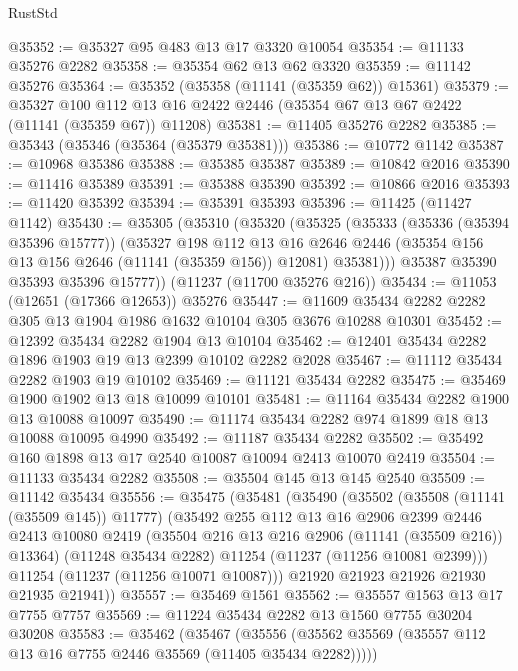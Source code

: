 \begin{lexlean}{RustStd}
\begin{coremodule}
@35352 := @35327 @95 @483 @13 @17 @3320 @10054
@35354 := @11133 @35276 @2282
@35358 := @35354 @62 @13 @62 @3320
@35359 := @11142 @35276
@35364 := @35352 (@35358 (@11141 (@35359 @62)) @15361)
@35379 := @35327
    @100
    @112
    @13
    @16
    @2422
    @2446
    (@35354 @67 @13 @67 @2422 (@11141 (@35359 @67)) @11208)
@35381 := @11405 @35276 @2282
@35385 := @35343 (@35346 (@35364 (@35379 @35381)))
@35386 := @10772 @1142
@35387 := @10968 @35386
@35388 := @35385 @35387
@35389 := @10842 @2016
@35390 := @11416 @35389
@35391 := @35388 @35390
@35392 := @10866 @2016
@35393 := @11420 @35392
@35394 := @35391 @35393
@35396 := @11425 (@11427 @1142)
@35430 := @35305
    (@35310
      (@35320
        (@35325
          (@35333
            (@35336 (@35394 @35396 @15777))
            (@35327
              @198
              @112
              @13
              @16
              @2646
              @2446
              (@35354 @156 @13 @156 @2646 (@11141 (@35359 @156)) @12081)
              @35381)))
        @35387
        @35390
        @35393
        @35396
        @15777))
    (@11237 (@11700 @35276 @216))
@35434 := @11053 (@12651 (@17366 @12653)) @35276
@35447 := @11609 @35434 @2282 @2282 @305 @13 @1904 @1986 @1632 @10104 @305 @3676 @10288 @10301
@35452 := @12392 @35434 @2282 @1904 @13 @10104
@35462 := @12401 @35434 @2282 @1896 @1903 @19 @13 @2399 @10102 @2282 @2028
@35467 := @11112 @35434 @2282 @1903 @19 @10102
@35469 := @11121 @35434 @2282
@35475 := @35469 @1900 @1902 @13 @18 @10099 @10101
@35481 := @11164 @35434 @2282 @1900 @13 @10088 @10097
@35490 := @11174 @35434 @2282 @974 @1899 @18 @13 @10088 @10095 @4990
@35492 := @11187 @35434 @2282
@35502 := @35492 @160 @1898 @13 @17 @2540 @10087 @10094 @2413 @10070 @2419
@35504 := @11133 @35434 @2282
@35508 := @35504 @145 @13 @145 @2540
@35509 := @11142 @35434
@35556 := @35475
    (@35481
      (@35490
        (@35502
          (@35508 (@11141 (@35509 @145)) @11777)
          (@35492
            @255
            @112
            @13
            @16
            @2906
            @2399
            @2446
            @2413
            @10080
            @2419
            (@35504 @216 @13 @216 @2906 (@11141 (@35509 @216)) @13364)
            (@11248 @35434 @2282)
            @11254
            (@11237 (@11256 @10081 @2399)))
          @11254
          (@11237 (@11256 @10071 @10087)))
        @21920
        @21923
        @21926
        @21930
        @21935
        @21941))
@35557 := @35469 @1561
@35562 := @35557 @1563 @13 @17 @7755 @7757
@35569 := @11224 @35434 @2282 @13 @1560 @7755 @30204 @30208
@35583 := @35462
    (@35467 (@35556 (@35562 @35569 (@35557 @112 @13 @16 @7755 @2446 @35569 (@11405 @35434 @2282)))))

\end{coremodule}
\end{lexlean}
